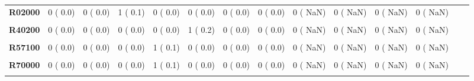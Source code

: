 \documentclass[
]{article}
\begin{document}
\begin{table}[H]
\begin{tabular}[t]{>{\raggedright\arraybackslash}p{5em}ccccccccccccc}
\textbf{R02000} & 0 (  0.0) & 0 (  0.0) & 1 (  0.1) & 0 (  0.0) & 0 (  0.0) & 0 (  0.0) & 0 (  0.0) & 0 (  NaN) & 0 (  NaN) & 0 (  NaN) & 0 (  NaN) &  & \\
\textbf{\cellcolor{gray!10}{R09200}} & \cellcolor{gray!10}{0 (  0.0)} & \cellcolor{gray!10}{1 (  0.1)} & \cellcolor{gray!10}{0 (  0.0)} & \cellcolor{gray!10}{0 (  0.0)} & \cellcolor{gray!10}{0 (  0.0)} & \cellcolor{gray!10}{0 (  0.0)} & \cellcolor{gray!10}{0 (  0.0)} & \cellcolor{gray!10}{0 (  NaN)} & \cellcolor{gray!10}{0 (  NaN)} & \cellcolor{gray!10}{0 (  NaN)} & \cellcolor{gray!10}{0 (  NaN)} & \cellcolor{gray!10}{} & \cellcolor{gray!10}{}\\
\textbf{R40200} & 0 (  0.0) & 0 (  0.0) & 0 (  0.0) & 0 (  0.0) & 1 (  0.2) & 0 (  0.0) & 0 (  0.0) & 0 (  NaN) & 0 (  NaN) & 0 (  NaN) & 0 (  NaN) &  & \\
\textbf{\cellcolor{gray!10}{R57000}} & \cellcolor{gray!10}{1 (  0.1)} & \cellcolor{gray!10}{0 (  0.0)} & \cellcolor{gray!10}{1 (  0.1)} & \cellcolor{gray!10}{0 (  0.0)} & \cellcolor{gray!10}{0 (  0.0)} & \cellcolor{gray!10}{0 (  0.0)} & \cellcolor{gray!10}{2 (  0.9)} & \cellcolor{gray!10}{0 (  NaN)} & \cellcolor{gray!10}{0 (  NaN)} & \cellcolor{gray!10}{0 (  NaN)} & \cellcolor{gray!10}{0 (  NaN)} & \cellcolor{gray!10}{} & \cellcolor{gray!10}{}\\
\textbf{R57100} & 0 (  0.0) & 0 (  0.0) & 0 (  0.0) & 1 (  0.1) & 0 (  0.0) & 0 (  0.0) & 0 (  0.0) & 0 (  NaN) & 0 (  NaN) & 0 (  NaN) & 0 (  NaN) &  & \\
\textbf{\cellcolor{gray!10}{R58000}} & \cellcolor{gray!10}{0 (  0.0)} & \cellcolor{gray!10}{1 (  0.1)} & \cellcolor{gray!10}{0 (  0.0)} & \cellcolor{gray!10}{0 (  0.0)} & \cellcolor{gray!10}{1 (  0.2)} & \cellcolor{gray!10}{0 (  0.0)} & \cellcolor{gray!10}{0 (  0.0)} & \cellcolor{gray!10}{0 (  NaN)} & \cellcolor{gray!10}{0 (  NaN)} & \cellcolor{gray!10}{0 (  NaN)} & \cellcolor{gray!10}{0 (  NaN)} & \cellcolor{gray!10}{} & \cellcolor{gray!10}{}\\
\textbf{R70000} & 0 (  0.0) & 0 (  0.0) & 0 (  0.0) & 1 (  0.1) & 0 (  0.0) & 0 (  0.0) & 0 (  0.0) & 0 (  NaN) & 0 (  NaN) & 0 (  NaN) & 0 (  NaN) &  & \\
\textbf{\cellcolor{gray!10}{R91000}} & \cellcolor{gray!10}{1 (  0.1)} & \cellcolor{gray!10}{0 (  0.0)} & \cellcolor{gray!10}{0 (  0.0)} & \cellcolor{gray!10}{0 (  0.0)} & \cellcolor{gray!10}{0 (  0.0)} & \cellcolor{gray!10}{0 (  0.0)} & \cellcolor{gray!10}{0 (  0.0)} & \cellcolor{gray!10}{0 (  NaN)} & \cellcolor{gray!10}{0 (  NaN)} & \cellcolor{gray!10}{0 (  NaN)} & \cellcolor{gray!10}{0 (  NaN)} & \cellcolor{gray!10}{} & \cellcolor{gray!10}{}\\

\end{tabular}
\end{table}
\end{document}

